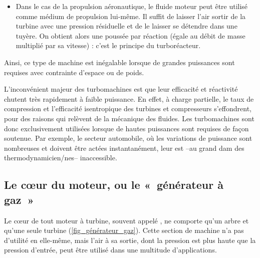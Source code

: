 		\begin{itemize}
			\item Dans le cas de la propulsion aéronautique, le fluide moteur peut être utilisé comme médium de propulsion lui-même. Il suffit de laisser l’air sortir de la turbine avec une pression résiduelle et de le laisser se détendre dans une tuyère. On obtient alors une poussée par réaction (égale au débit de masse multiplié par sa vitesse) : c’est le principe du turboréacteur.
		\end{itemize}

		Ainsi, ce type de machine est inégalable lorsque de grandes puissances sont requises avec contrainte d’espace ou de poids.

		L’inconvénient majeur des turbomachines est que leur efficacité et réactivité chutent très rapidement à faible puissance. En effet, à charge partielle, le taux de compression et l’efficacité isentropique des turbines et compresseurs s’effondrent, pour des raisons qui relèvent de la mécanique des fluides. Les turbomachines sont donc exclusivement utilisées lorsque de hautes puissances sont requises de façon soutenue. Par exemple, le secteur automobile, où les variations de puissance sont nombreuses et doivent être actées instantanément, leur est --au grand dam des thermodynamicien/nes-- inaccessible.


	\subsection{Le cœur du moteur, ou le «~générateur à gaz~»}
	\label{ch_generateur_gaz}

		Le cœur de tout moteur à turbine, souvent appelé , ne comporte qu’un arbre et qu’une seule turbine (\cref{fig_générateur_gaz}). Cette section de machine n’a pas d’utilité en elle-même, mais l’air à sa sortie, dont la pression est plus haute que la pression d’entrée, peut être utilisé dans une multitude d’applications.

